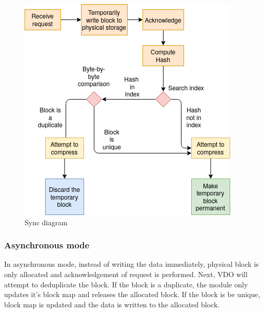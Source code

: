 \documentclass[
  color, %
  table, %
  lof,   %
  lot,   %
]{fithesis3}
\begin{document}
\begin{figure}[!htb]
        \centering
        \includegraphics[width=\textwidth]{graphics/diagrams/sync.png}
\caption[Sync]{Sync diagram}
\label{fig:sync}
\end{figure}

\subsubsection{Asynchronous mode}
In asynchronous mode, instead of writing the data immediately, physical block is only allocated and acknowledgement of request is performed. Next, VDO will attempt to deduplicate the block. If the block is a duplicate, the module only updates it's block map and releases the allocated block. If the block is be unique, block map is updated and the data is written to the allocated block.
\end{document}
